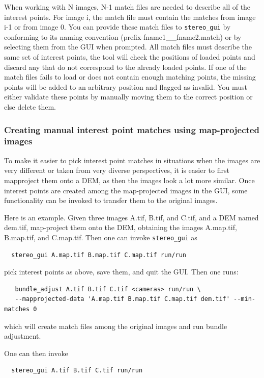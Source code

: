 When working with N images, N-1 match files are needed to describe all of
the interest points.  For image i, the match file must contain the matches
from image i-1 or from image 0.  You can provide these match files to 
\texttt{stereo\_gui} by conforming to its naming convention
(prefix-fname1\_\_fname2.match) or by selecting them from the GUI when 
prompted.  All match files must describe the same set of interest points,
the tool will check the positions of loaded points and discard any that
do not correspond to the already loaded points.  If one of the match files 
fails to load or does not contain enough matching points, the missing points
will be added to an arbitrary position and flagged as invalid.  You must
either validate these points by manually moving them to the correct position
or else delete them.

\subsubsection{Creating manual interest point matches using map-projected images}
\label{mapip}

To make it easier to pick interest point matches in situations when the
images are very different or taken from very diverse perspectives, it is
easier to first mapproject them onto a DEM, as then the images look a
lot more similar. Once interest points are created among the
map-projected images in the GUI, some functionality can be invoked to
transfer them to the original images.

Here is an example. Given three images A.tif, B.tif, and C.tif, and a DEM named 
dem.tif, map-project them onto the DEM, obtaining the images A.map.tif, B.map.tif, and C.map.tif.
Then one can invoke \texttt{stereo\_gui} as
\begin{verbatim}
  stereo_gui A.map.tif B.map.tif C.map.tif run/run
\end{verbatim}
pick interest points as above, save them, and quit the GUI. Then one runs:

\begin{verbatim}
   bundle_adjust A.tif B.tif C.tif <cameras> run/run \
   --mapprojected-data 'A.map.tif B.map.tif C.map.tif dem.tif' --min-matches 0  
\end{verbatim}
which will create match files among the original images and run bundle adjustment.

One can then invoke
\begin{verbatim}
  stereo_gui A.tif B.tif C.tif run/run
\end{verbatim}

